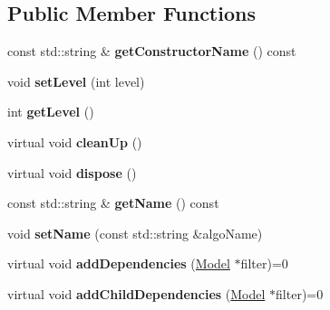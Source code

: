 \subsection*{Public Member Functions}
\begin{DoxyCompactItemize}
\item 
\mbox{\label{classfilter_1_1_model_a22c95602d5366b1efc41b2668e93ce6c}} 
const std\+::string \& {\bfseries get\+Constructor\+Name} () const
\item 
\mbox{\label{classfilter_1_1_model_af658201bb4c6d6c31fb7f978ddf3a125}} 
void {\bfseries set\+Level} (int level)
\item 
\mbox{\label{classfilter_1_1_model_acf9da127fbef97177afae76bc31614b6}} 
int {\bfseries get\+Level} ()
\item 
\mbox{\label{classfilter_1_1_model_ac03bad5af26d6d2134dea34ea441fca2}} 
virtual void {\bfseries clean\+Up} ()
\item 
\mbox{\label{classfilter_1_1_model_acdae85f578b397cb4e5578b254353275}} 
virtual void {\bfseries dispose} ()
\item 
\mbox{\label{classfilter_1_1_model_af7b7ef06cadee566c46406b3c2f99b7b}} 
const std\+::string \& {\bfseries get\+Name} () const
\item 
\mbox{\label{classfilter_1_1_model_a96d0f4f97a80a3f43c5f4dc5803f3289}} 
void {\bfseries set\+Name} (const std\+::string \&algo\+Name)
\item 
\mbox{\label{classfilter_1_1_model_a7a2eb30daf6a7ecc8805b892c1650277}} 
virtual void {\bfseries add\+Dependencies} (\hyperlink{classfilter_1_1_model}{Model} $\ast$filter)=0
\item 
\mbox{\label{classfilter_1_1_model_a45e9ae7620c9e21ed18e32441a803921}} 
virtual void {\bfseries add\+Child\+Dependencies} (\hyperlink{classfilter_1_1_model}{Model} $\ast$filter)=0
\item 
\mbox{\label{classfilter_1_1_model_ab5eb860ee61443bf8fc78ae4f43dfc93}} 

\end{DoxyCompactItemize}
